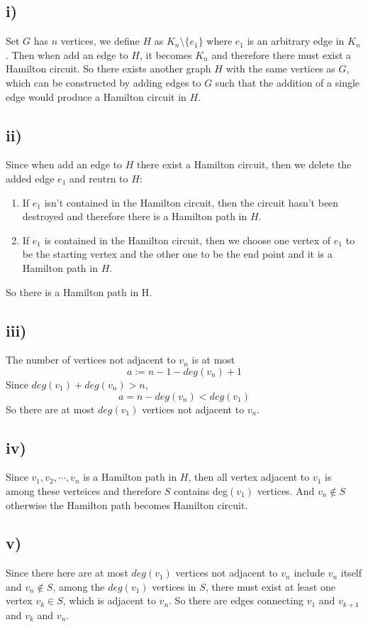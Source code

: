 \documentclass[a4paper,12pt,titlepage]{article}
\begin{document}
\subsection*{i)}
Set $G$ has $n$ vertices, we define $H$ as $K_n\setminus\lbrace e_1\rbrace$ where $e_1$ is an arbitrary edge in $K_n$. Then when add an edge to $H$, it becomes $K_n$ and therefore there must exist a Hamilton circuit. So there exists another graph $H$ with the same vertices as $G$, which can be constructed by adding edges to $G$ such that the addition of a single edge would produce a Hamilton circuit in $H$. 
 
\subsection*{ii)}
Since when add an edge to $H$ there exist a Hamilton circuit, then we delete the added edge $e_1$ and reutrn to $H$:
\begin{enumerate}
\item If $e_1$ isn't contained in the Hamilton circuit, then the circuit hasn't been destroyed and therefore there is a Hamilton path in $H$.

\item If $e_1$ is contained in the Hamilton circuit, then we choose one vertex of $e_1$ to be the starting vertex and the other one to be the end point and it is a Hamilton path in $H$.
\end{enumerate}
So there is a Hamilton path in H.
\subsection*{iii)}
The number of vertices not adjacent to $v_n$ is at most
$$a:=n-1-deg(v_n)+1$$
Since $deg(v_1)+deg(v_n)>n$, 
$$a=n-deg(v_n)<deg(v_1)$$
So there are at most $deg(v_1)$ vertices not adjacent to $v_n$. 

\subsection*{iv)}
Since $v_1,v_2,\cdots,v_n$ is a Hamilton path in $H$, then all vertex adjacent to $v_1$ is among these verteices and therefore $S$ contains deg$(v_1)$ vertices. And $v_n\notin S$ otherwise the Hamilton path becomes Hamilton circuit.    

\subsection*{v)}
Since there here are at most $deg(v_1)$ vertices not adjacent to $v_n$ include $v_n$ itself and $v_n\notin S$, among the $deg(v_1)$ vertices in $S$, there must exist at least one vertex $v_k\in S$, which is adjacent to $v_n$.  So there are edges connecting $v_1$ and $v_{k+1}$ and $v_k$ and $v_n$.
\end{document}
